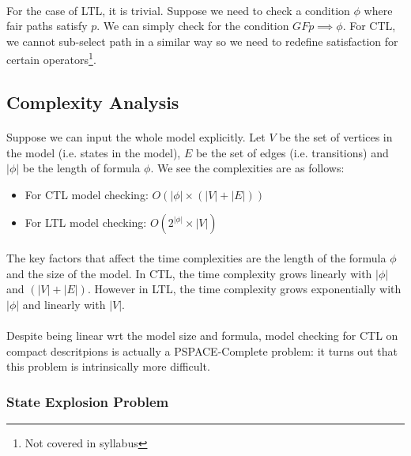 \documentclass{article}
\theoremstyle{plain}
\theoremstyle{definition}
\begin{document}
\begin{multicols}{2}
\paragraph{} For the case of LTL, it is trivial. Suppose we need to check a condition $\phi$ where fair paths satisfy $p$. We can simply check for the condition $GFp \implies \phi$. For CTL, we cannot sub-select path in a similar way so we need to redefine satisfaction for certain operators\footnote{Not covered in syllabus}.

\subsection{Complexity Analysis}\label{sec:ExplicitModelCheckingComplexityAnalysis}

\paragraph{} Suppose we can input the whole model explicitly. Let $V$ be the set of vertices in the model (i.e. states in the model), $E$ be the set of edges (i.e. transitions) and $|\phi|$ be the length of formula $\phi$. We see the complexities are as follows:

\begin{itemize}
\item For CTL model checking: $O(|\phi| \times (|V| + |E|))$
\item For LTL model checking: $O(2^{|\phi|} \times |V|)$
\end{itemize}

\paragraph{} The key factors that affect the time complexities are the length of the formula $\phi$ and the size of the model. In CTL, the time complexity grows linearly with $|\phi|$ and $(|V| + |E|)$. However in LTL, the time complexity grows exponentially with $|\phi|$ and linearly with $|V|$. 

\paragraph{} Despite being linear wrt the model size and formula, model checking for CTL on compact descritpions is actually a PSPACE-Complete problem: it turns out that this problem is intrinsically more difficult. 

\subsubsection{State Explosion Problem}


\end{multicols}
\end{document}
